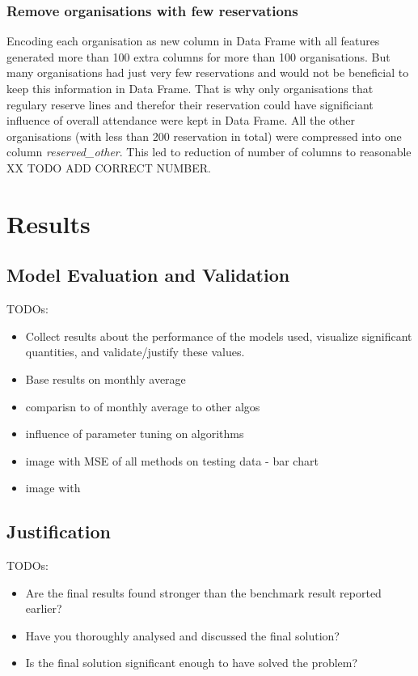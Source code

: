 \documentclass{article}
\begin{document}
\subsubsection{Remove organisations with few reservations}
Encoding each organisation as new column in Data Frame with all features generated more than 100 extra columns for more than 100 organisations. But many organisations had just very few reservations and would not be beneficial to keep this information in Data Frame. That is why only organisations that regulary reserve lines and therefor their reservation could have significiant influence of overall attendance were kept in Data Frame. All the other organisations (with less than 200 reservation in total) were compressed into one column \emph{reserved\_other}. This led to reduction of number of columns to reasonable XX TODO ADD CORRECT NUMBER.

\section{Results}
\subsection{Model Evaluation and Validation}
\color{red}
TODOs:
\begin{itemize}
    \item Collect results about the performance of the models used, visualize significant quantities, and validate/justify these values. 
    \item Base results on monthly average
    \item comparisn to of monthly average to other algos
    \item influence of parameter tuning on algorithms
    \item image with MSE of all methods on testing data - bar chart
    \item image with 
\end{itemize}
\color{black}

\subsection{Justification}
\color{red}
TODOs:
\begin{itemize}
    \item Are the final results found stronger than the benchmark result reported earlier?
    \item Have you thoroughly analysed and discussed the final solution?
    \item Is the final solution significant enough to have solved the problem?
\end{itemize}
\color{black}
\end{document}
